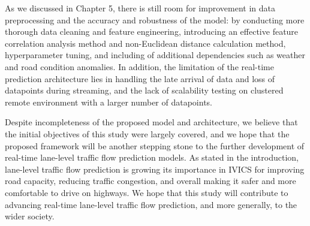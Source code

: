 \documentclass[11pt]{uonthesis}
\begin{document}
As we discussed in Chapter 5, there is still room for improvement in data preprocessing and the accuracy and robustness of the model: by conducting more thorough data cleaning and feature engineering, introducing an effective feature correlation analysis method and non-Euclidean distance calculation method, hyperparameter tuning, and including of additional dependencies such as weather and road condition anomalies. In addition, the limitation of the real-time prediction architecture lies in handling the late arrival of data and loss of datapoints during streaming, and the lack of scalability testing on clustered remote environment with a larger number of datapoints.

Despite incompleteness of the proposed model and architecture, we believe that the initial objectives of this study were largely covered, and we hope that the proposed framework will be another stepping stone to the further development of real-time lane-level traffic flow prediction models. As stated in the introduction, lane-level traffic flow prediction is growing its importance in IVICS for improving road capacity, reducing traffic congestion, and overall making it safer and more comfortable to drive on highways. We hope that this study will contribute to advancing real-time lane-level traffic flow prediction, and more generally, to the wider society.



\end{document}
